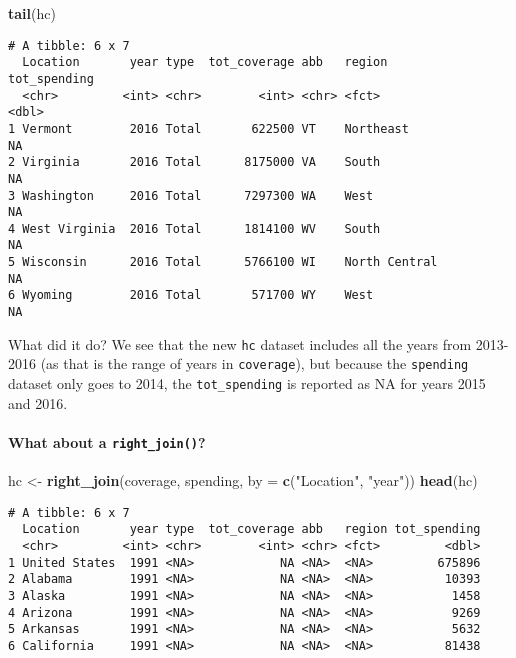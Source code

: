 \documentclass[]{article}
\newenvironment{Shaded}{\begin{snugshade}}{\end{snugshade}}
\newcommand{\DataTypeTok}[1]{\textcolor[rgb]{0.13,0.29,0.53}{#1}}
\newcommand{\KeywordTok}[1]{\textcolor[rgb]{0.13,0.29,0.53}{\textbf{#1}}}
\newcommand{\NormalTok}[1]{#1}
\newcommand{\StringTok}[1]{\textcolor[rgb]{0.31,0.60,0.02}{#1}}
\let\oldparagraph\paragraph
\renewcommand{\paragraph}[1]{\oldparagraph{#1}\mbox{}}
\begin{document}
\begin{Shaded}
\begin{Highlighting}[]
\KeywordTok{tail}\NormalTok{(hc)}
\end{Highlighting}
\end{Shaded}

\begin{verbatim}
# A tibble: 6 x 7
  Location       year type  tot_coverage abb   region        tot_spending
  <chr>         <int> <chr>        <int> <chr> <fct>                <dbl>
1 Vermont        2016 Total       622500 VT    Northeast               NA
2 Virginia       2016 Total      8175000 VA    South                   NA
3 Washington     2016 Total      7297300 WA    West                    NA
4 West Virginia  2016 Total      1814100 WV    South                   NA
5 Wisconsin      2016 Total      5766100 WI    North Central           NA
6 Wyoming        2016 Total       571700 WY    West                    NA
\end{verbatim}

What did it do? We see that the new \texttt{hc} dataset includes all the
years from 2013-2016 (as that is the range of years in
\texttt{coverage}), but because the \texttt{spending} dataset only goes
to 2014, the \texttt{tot\_spending} is reported as NA for years 2015 and
2016.

\hypertarget{what-about-a-right_join}{%
\paragraph{\texorpdfstring{What about a
\texttt{right\_join()}?}{What about a right\_join()?}}\label{what-about-a-right_join}}

\begin{Shaded}
\begin{Highlighting}[]
\NormalTok{hc <-}\StringTok{ }\KeywordTok{right_join}\NormalTok{(coverage, spending, }\DataTypeTok{by =} \KeywordTok{c}\NormalTok{(}\StringTok{"Location"}\NormalTok{, }\StringTok{"year"}\NormalTok{))}
\KeywordTok{head}\NormalTok{(hc)}
\end{Highlighting}
\end{Shaded}

\begin{verbatim}
# A tibble: 6 x 7
  Location       year type  tot_coverage abb   region tot_spending
  <chr>         <int> <chr>        <int> <chr> <fct>         <dbl>
1 United States  1991 <NA>            NA <NA>  <NA>         675896
2 Alabama        1991 <NA>            NA <NA>  <NA>          10393
3 Alaska         1991 <NA>            NA <NA>  <NA>           1458
4 Arizona        1991 <NA>            NA <NA>  <NA>           9269
5 Arkansas       1991 <NA>            NA <NA>  <NA>           5632
6 California     1991 <NA>            NA <NA>  <NA>          81438
\end{verbatim}
\end{document}
